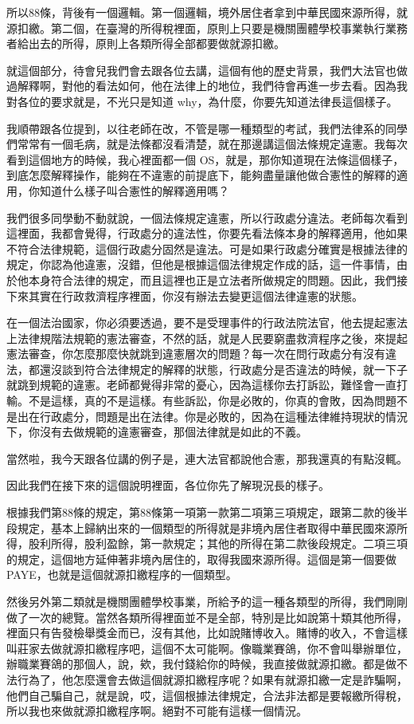 \documentclass[]{ctexbook}
\begin{document}
所以88條，背後有一個邏輯。第一個邏輯，境外居住者拿到中華民國來源所得，就源扣繳。第二個，在臺灣的所得稅裡面，原則上只要是機關團體學校事業執行業務者給出去的所得，原則上各類所得全部都要做就源扣繳。

就這個部分，待會兒我們會去跟各位去講，這個有他的歷史背景，我們大法官也做過解釋啊，對他的看法如何，他在法律上的地位，我們待會再進一步去看。因為我對各位的要求就是，不光只是知道 why，為什麼，你要先知道法律長這個樣子。

我順帶跟各位提到，以往老師在改，不管是哪一種類型的考試，我們法律系的同學們常常有一個毛病，就是法條都沒看清楚，就在那邊講這個法條規定違憲。我每次看到這個地方的時候，我心裡面都一個 OS，就是，那你知道現在法條這個樣子，到底怎麼解釋操作，能夠在不違憲的前提底下，能夠盡量讓他做合憲性的解釋的適用，你知道什么樣子叫合憲性的解釋適用嗎？

我們很多同學動不動就說，一個法條規定違憲，所以行政處分違法。老師每次看到這裡面，我都會覺得，行政處分的違法性，你要先看法條本身的解釋適用，他如果不符合法律規範，這個行政處分固然是違法。可是如果行政處分確實是根據法律的規定，你認為他違憲，沒錯，但他是根據這個法律規定作成的話，這一件事情，由於他本身符合法律的規定，而且這裡也正是立法者所做規定的問題。因此，我們接下來其實在行政救濟程序裡面，你沒有辦法去變更這個法律違憲的狀態。

在一個法治國家，你必須要透過，要不是受理事件的行政法院法官，他去提起憲法上法律規階法規範的憲法審查，不然的話，就是人民要窮盡救濟程序之後，來提起憲法審查，你怎麼那麼快就跳到違憲層次的問題？每一次在問行政處分有沒有違法，都還沒談到符合法律規定的解釋的狀態，行政處分是否違法的時候，就一下子就跳到規範的違憲。老師都覺得非常的憂心，因為這樣你去打訴訟，難怪會一直打輸。不是這樣，真的不是這樣。有些訴訟，你是必敗的，你真的會敗，因為問題不是出在行政處分，問題是出在法律。你是必敗的，因為在這種法律維持現狀的情況下，你沒有去做規範的違憲審查，那個法律就是如此的不義。

當然啦，我今天跟各位講的例子是，連大法官都說他合憲，那我還真的有點沒輒。

因此我們在接下來的這個說明裡面，各位你先了解現況長的樣子。

根據我們第88條的規定，第88條第一項第一款第二項第三項規定，跟第二款的後半段規定，基本上歸納出來的一個類型的所得就是非境內居住者取得中華民國來源所得，股利所得，股利盈餘，第一款規定；其他的所得在第二款後段規定。二項三項的規定，這個地方延伸著非境內居住的，取得我國來源所得。這個是第一個要做PAYE，也就是這個就源扣繳程序的一個類型。

然後另外第二類就是機關團體學校事業，所給予的這一種各類型的所得，我們剛剛做了一次的總覽。當然各類所得裡面並不是全部，特別是比如說第十類其他所得，裡面只有告發檢舉獎金而已，沒有其他，比如說賭博收入。賭博的收入，不會這樣叫莊家去做就源扣繳程序吧，這個不太可能啊。像職業賽鴿，你不會叫舉辦單位，辦職業賽鴿的那個人，說，欸，我付錢給你的時候，我直接做就源扣繳。都是做不法行為了，他怎麼還會去做這個就源扣繳程序呢？如果有就源扣繳一定是詐騙啊，他們自己騙自己，就是說，哎，這個根據法律規定，合法非法都是要報繳所得稅，所以我也來做就源扣繳程序啊。絕對不可能有這樣一個情況。
\end{document}

